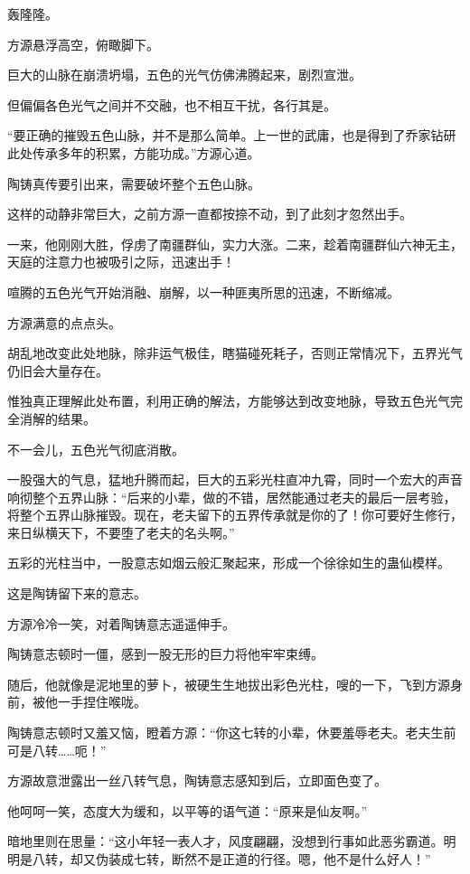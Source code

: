 
\begin{this_body}

轰隆隆。

方源悬浮高空，俯瞰脚下。

巨大的山脉在崩溃坍塌，五色的光气仿佛沸腾起来，剧烈宣泄。

但偏偏各色光气之间并不交融，也不相互干扰，各行其是。

“要正确的摧毁五色山脉，并不是那么简单。上一世的武庸，也是得到了乔家钻研此处传承多年的积累，方能功成。”方源心道。

陶铸真传要引出来，需要破坏整个五色山脉。

这样的动静非常巨大，之前方源一直都按捺不动，到了此刻才忽然出手。

一来，他刚刚大胜，俘虏了南疆群仙，实力大涨。二来，趁着南疆群仙六神无主，天庭的注意力也被吸引之际，迅速出手！

喧腾的五色光气开始消融、崩解，以一种匪夷所思的迅速，不断缩减。

方源满意的点点头。

胡乱地改变此处地脉，除非运气极佳，瞎猫碰死耗子，否则正常情况下，五界光气仍旧会大量存在。

惟独真正理解此处布置，利用正确的解法，方能够达到改变地脉，导致五色光气完全消解的结果。

不一会儿，五色光气彻底消散。

一股强大的气息，猛地升腾而起，巨大的五彩光柱直冲九霄，同时一个宏大的声音响彻整个五界山脉：“后来的小辈，做的不错，居然能通过老夫的最后一层考验，将整个五界山脉摧毁。现在，老夫留下的五界传承就是你的了！你可要好生修行，来日纵横天下，不要堕了老夫的名头啊。”

五彩的光柱当中，一股意志如烟云般汇聚起来，形成一个徐徐如生的蛊仙模样。

这是陶铸留下来的意志。

方源冷冷一笑，对着陶铸意志遥遥伸手。

陶铸意志顿时一僵，感到一股无形的巨力将他牢牢束缚。

随后，他就像是泥地里的萝卜，被硬生生地拔出彩色光柱，嗖的一下，飞到方源身前，被他一手捏住喉咙。

陶铸意志顿时又羞又恼，瞪着方源：“你这七转的小辈，休要羞辱老夫。老夫生前可是八转……呃！”

方源故意泄露出一丝八转气息，陶铸意志感知到后，立即面色变了。

他呵呵一笑，态度大为缓和，以平等的语气道：“原来是仙友啊。”

暗地里则在思量：“这小年轻一表人才，风度翩翩，没想到行事如此恶劣霸道。明明是八转，却又伪装成七转，断然不是正道的行径。嗯，他不是什么好人！”


\end{this_body}
